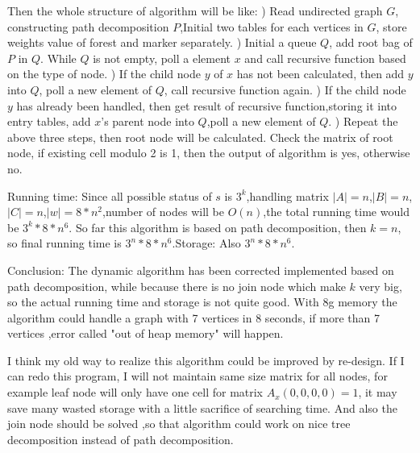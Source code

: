Then the whole structure of algorithm will be like:
) Read undirected graph $G$, constructing path decomposition $P$,Initial two tables for each vertices in $G$, store weights value of forest and marker separately.
) Initial a queue $Q$, add root bag of $P$ in $Q$. While $Q$ is not empty, poll a element $x$ and call recursive function based on the type of node.
) If the child node $y$ of $x$ has not been calculated, then add $y$ into $Q$, poll a new element of $Q$, call recursive function again.
) If the child node $y$ has already been handled, then get result of recursive function,storing it into entry tables, add $x$'s parent node into $Q$,poll a new element of $Q$.
) Repeat the above three steps, then root node will be calculated. Check the matrix of root node, if existing cell modulo 2 is 1, then the output of algorithm is yes, otherwise no.

\noindent Running time:
Since all possible status of $s$ is $3^k$,handling matrix $|A|=n$,$|B|=n$,$|C|=n$,$|w|=8*n^2$,number of nodes will be $O(n)$,the total running time would be $3^k*8*n^6$. So far this algorithm is based on path decomposition, then $k=n$, so final running time is $3^n*8*n^6$.Storage: Also $3^n*8*n^6$.

\noindent Conclusion:
The dynamic algorithm has been corrected implemented based on path decomposition, while because there is no join node which make $k$ very big, so the actual running time and storage is not quite good. With 8g memory the algorithm could handle a graph with 7 vertices in 8 seconds, if more than 7 vertices ,error called "out of heap memory" will happen.

\noindent I think my old way to realize this algorithm could be improved by re-design. If I can redo this program, I will not maintain same size matrix for all nodes, for example leaf node will only have one cell for matrix $A_x(0,0,0,0)=1$, it may save many wasted storage with a little sacrifice of searching time. And also the join node should be solved ,so that algorithm could work on nice tree decomposition instead of path decomposition.


